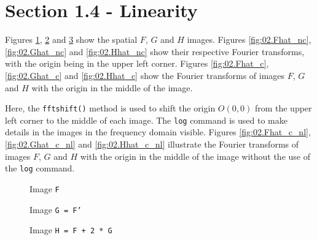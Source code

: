 \section{Section 1.4 - Linearity}

Figures \ref{fig:02.F}, \ref{fig:02.G} and \ref{fig:02.H} show the spatial $F$, $G$ and $H$ images.
Figures \ref{fig:02.Fhat_nc}, \ref{fig:02.Ghat_nc} and \ref{fig:02.Hhat_nc} show their respective Fourier transforms, with the origin
being in the upper left corner. Figures \ref{fig:02.Fhat_c}, \ref{fig:02.Ghat_c} and \ref{fig:02.Hhat_c} show the Fourier transforms of images $F$, $G$ and $H$
with the origin in the middle of the image.

Here, the \texttt{fftshift()} method is used to shift the origin $O(0,0)$ from the upper left corner to the middle of each image.
The \texttt{log} command is used to make details in the images in the frequency domain visible. 
Figures \ref{fig:02.Fhat_c_nl}, \ref{fig:02.Ghat_c_nl} and \ref{fig:02.Hhat_c_nl} illustrate the Fourier transforms of images $F$, $G$ and $H$
with the origin in the middle of the image without the use of the \texttt{log} command.

\begin{minipage}{\linewidth}
  \centering
  \begin{minipage}{0.25\linewidth}
    \vspace{-0.15\linewidth}
    \begin{figure}[H]
      \scalebox{0.4}{}
      \caption{Image \texttt{F}}
      \label{fig:02.F}
    \end{figure}
  \end{minipage}
  \hspace{0.05\linewidth}
  \begin{minipage}{0.25\linewidth}
    \begin{figure}[H]
      \scalebox{0.4}{}
      \caption{Image \texttt{G = F'}}
      \label{fig:02.G}
    \end{figure}
  \end{minipage}
  \hspace{0.05\linewidth}
  \begin{minipage}{0.25\linewidth}
    \begin{figure}[H]
      \scalebox{0.4}{}
      \caption{Image \texttt{H = F + 2 * G}}
      \label{fig:02.H}
    \end{figure}
  \end{minipage}
\end{minipage}


